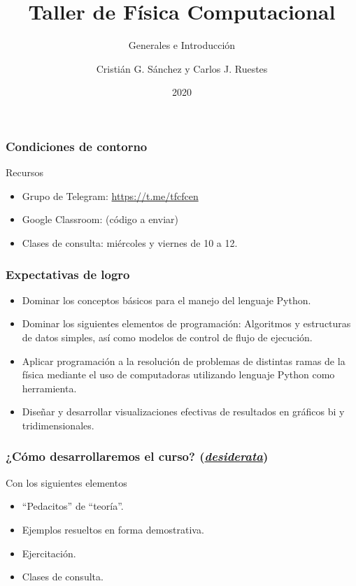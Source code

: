 \documentclass[aspectratio=169]{beamer}
\title{Taller de Física Computacional}
\subtitle{Generales e Introducción}
\author{Cristián G. Sánchez y Carlos J. Ruestes}
\date{2020}
\begin{document}
\frame{\titlepage}


\begin{frame}
\frametitle{Condiciones de contorno}
\begin{block}{Recursos}
\begin{itemize}
\item Grupo de Telegram: \url{https://t.me/tfcfcen}
\item Google Classroom: (código a enviar)
\item Clases de \alert{consulta}: miércoles y viernes de 10 a 12.
\end{itemize}
\end{block}
\end{frame}


\begin{frame}
\frametitle{Expectativas de logro}
\begin{itemize}
\item Dominar los conceptos básicos para el manejo del lenguaje Python. 
\item Dominar los siguientes elementos de programación: Algoritmos y estructuras de datos simples, así como modelos de control de flujo de ejecución. 
\item Aplicar programación a la resolución de problemas de distintas ramas de la física mediante el uso de computadoras utilizando lenguaje Python como herramienta. 
\item Diseñar y desarrollar visualizaciones efectivas de resultados en gráficos bi y tridimensionales.
\end{itemize}
\end{frame}


\begin{frame}
\frametitle{¿Cómo desarrollaremos el curso? ({\em \href{https://dle.rae.es/desiderata}{desiderata}})}
Con los siguientes elementos
\begin{itemize}
\item ``Pedacitos'' de ``teoría''.
\item Ejemplos resueltos en forma demostrativa.
\item Ejercitación.
\item Clases de consulta.
\end{itemize}
\end{frame}
\end{document}
